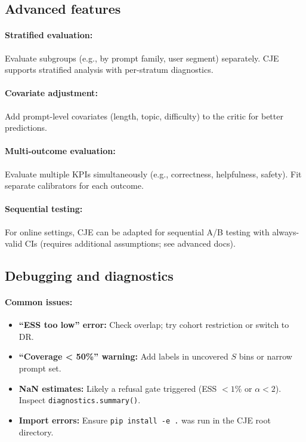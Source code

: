 \subsection{Advanced features}

\paragraph{Stratified evaluation:} Evaluate subgroups (e.g., by prompt family, user segment) separately. CJE supports stratified analysis with per-stratum diagnostics.

\paragraph{Covariate adjustment:} Add prompt-level covariates (length, topic, difficulty) to the critic for better predictions.

\paragraph{Multi-outcome evaluation:} Evaluate multiple KPIs simultaneously (e.g., correctness, helpfulness, safety). Fit separate calibrators for each outcome.

\paragraph{Sequential testing:} For online settings, CJE can be adapted for sequential A/B testing with always-valid CIs (requires additional assumptions; see advanced docs).

\subsection{Debugging and diagnostics}

\paragraph{Common issues:}
\begin{itemize}
\item \textbf{``ESS too low'' error:} Check overlap; try cohort restriction or switch to DR.
\item \textbf{``Coverage < 50\%'' warning:} Add labels in uncovered $S$ bins or narrow prompt set.
\item \textbf{NaN estimates:} Likely a refusal gate triggered (ESS $< 1\%$ or $\alpha < 2$). Inspect \texttt{diagnostics.summary()}.
\item \textbf{Import errors:} Ensure \texttt{pip install -e .} was run in the CJE root directory.
\end{itemize}

